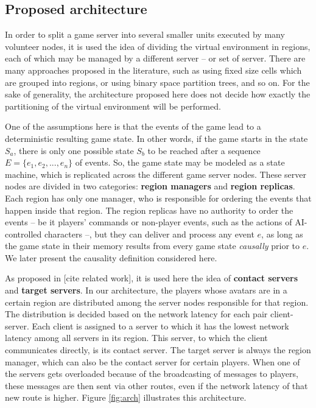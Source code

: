 \documentclass[]{usiinfprospectus}
\begin{document}
\subsection{Proposed architecture} \label{sec:arch}

In order to split a game server into several smaller units executed by many volunteer nodes, it is used the idea of dividing the virtual environment in regions, each of which may be managed by a different server -- or set of server. There are many approaches proposed in the literature, such as using fixed size cells which are grouped into regions, or using binary space partition trees, and so on. For the sake of generality, the architecture proposed here  does not decide how exactly the partitioning of the virtual environment will be performed.

One of the assumptions here is that the events of the game lead to a deterministic resulting game state. In other words, if the game starts in the state $S_{a}$, there is only one possible state $S_{b}$ to be reached after a sequence $E=\{e_{1}, e_{2}, ..., e_{n}\}$ of events. So, the game state may be modeled as a state machine, which is replicated across the different game server nodes. These server nodes are divided in two categories: \textbf{region managers} and \textbf{region replicas}. Each region has only one manager, who is responsible for ordering the events that happen inside that region. The region replicas have no authority to order the events -- be it players' commands or non-player events, such as the actions of AI-controlled characters --, but they can deliver and process any event $e$, as long as the game state in their memory results from every game state \textit{causally} prior to $e$. We later present the causality definition considered here.

As proposed in [cite related work], it is used here the idea of \textbf{contact servers} and \textbf{target servers}. In our architecture, the players whose avatars are in a certain region are distributed among the server nodes responsible for that region. The distribution is decided based on the network latency for each pair client-server. Each client is assigned to a server to which it has the lowest network latency among all servers in its region. This server, to which the client communicates directly, is its contact server. The target server is always the region manager, which can also be the contact server for certain players. When one of the servers gets overloaded because of the broadcasting of messages to players, these messages are then sent via other routes, even if the network latency of that new route is higher. Figure \ref{fig:arch} illustrates this architecture.
\end{document}
